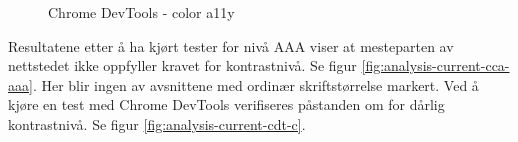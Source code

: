 \begin{figure}[H]
    \begin{center}
        \caption{Chrome DevTools - color a11y}
        \label{fig:analysis-current-cdt}
    \end{center}
\end{figure}

Resultatene etter å ha kjørt tester for nivå AAA viser at mesteparten av nettstedet ikke oppfyller kravet for kontrastnivå. Se figur \ref{fig:analysis-current-cca-aaa}. Her blir ingen av avsnittene med ordinær skriftstørrelse markert. Ved å kjøre en test med Chrome DevTools verifiseres påstanden om for dårlig kontrastnivå. Se figur \ref{fig:analysis-current-cdt-c}.


